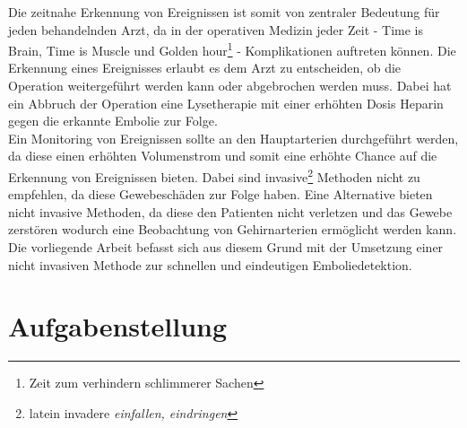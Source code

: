 Die zeitnahe Erkennung von Ereignissen ist somit von zentraler Bedeutung für jeden behandelnden Arzt, da in der operativen Medizin jeder Zeit -  \glqq Time is Brain\grqq{}, \glqq Time is Muscle\grqq{} und \glqq Golden hour\footnote{Zeit zum verhindern schlimmerer Sachen}\grqq{} - Komplikationen auftreten können. Die Erkennung eines Ereignisses erlaubt es dem Arzt zu entscheiden, ob die Operation weitergeführt werden kann oder abgebrochen werden muss. Dabei hat ein Abbruch der Operation eine Lysetherapie mit einer erhöhten Dosis Heparin gegen die erkannte Embolie zur Folge.\\
Ein Monitoring von Ereignissen sollte an den Hauptarterien durchgeführt werden, da diese einen erhöhten Volumenstrom und somit eine erhöhte Chance auf die Erkennung von Ereignissen bieten. Dabei sind invasive\footnote{latein invadere \textit{einfallen, eindringen}} Methoden nicht zu empfehlen, da diese Gewebeschäden zur Folge haben. Eine Alternative bieten nicht invasive Methoden, da diese den Patienten nicht verletzen und das Gewebe zerstören wodurch eine Beobachtung von Gehirnarterien ermöglicht werden kann.\\
Die vorliegende Arbeit befasst sich aus diesem Grund mit der Umsetzung einer nicht invasiven Methode zur schnellen und eindeutigen Emboliedetektion.

\section{Aufgabenstellung}
